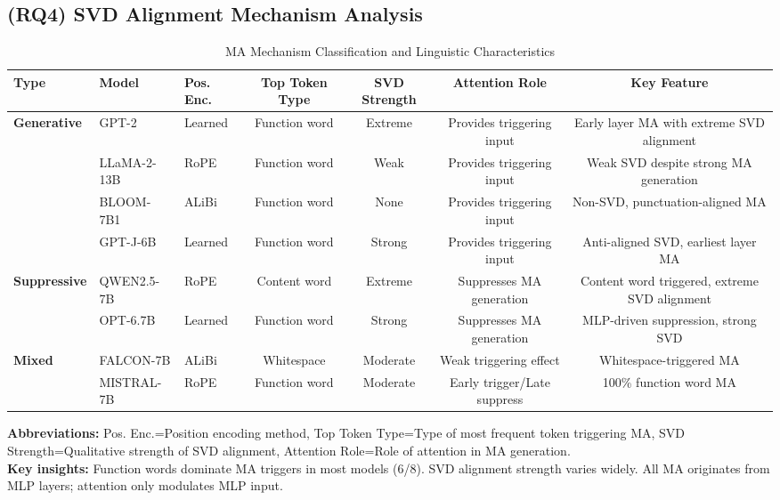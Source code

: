 \documentclass[conference]{IEEEtran}
\begin{document}
\subsection{(RQ4) SVD Alignment Mechanism Analysis}
\label{sec:RQ4}

\begin{table}[htbp]
\centering
\caption{MA Mechanism Classification and Linguistic Characteristics}
\label{tab:ma_mechanism_linguistic}
\footnotesize
\begin{tabular}{@{}lllcccc@{}}
\toprule
\textbf{Type} & \textbf{Model} & \textbf{Pos. Enc.} & \textbf{Top Token Type} & \textbf{SVD Strength} & \textbf{Attention Role} & \textbf{Key Feature} \\
\midrule
\multirow{4}{*}{\textbf{Generative}} 
& GPT-2 & Learned & Function word & Extreme & Provides triggering input & Early layer MA with extreme SVD alignment \\
& LLaMA-2-13B & RoPE & Function word & Weak & Provides triggering input & Weak SVD despite strong MA generation \\
& BLOOM-7B1 & ALiBi & Function word & None & Provides triggering input & Non-SVD, punctuation-aligned MA \\
& GPT-J-6B & Learned & Function word & Strong & Provides triggering input & Anti-aligned SVD, earliest layer MA \\
\midrule
\multirow{2}{*}{\textbf{Suppressive}}
& QWEN2.5-7B & RoPE & Content word & Extreme & Suppresses MA generation & Content word triggered, extreme SVD alignment \\
& OPT-6.7B & Learned & Function word & Strong & Suppresses MA generation & MLP-driven suppression, strong SVD \\
\midrule
\multirow{2}{*}{\textbf{Mixed}}
& FALCON-7B & ALiBi & Whitespace & Moderate & Weak triggering effect & Whitespace-triggered MA \\
& MISTRAL-7B & RoPE & Function word & Moderate & Early trigger/Late suppress & 100\% function word MA \\
\bottomrule
\end{tabular}

\vspace{2mm}
\parbox{\linewidth}{\scriptsize
\textbf{Abbreviations:} Pos. Enc.=Position encoding method, Top Token Type=Type of most frequent token triggering MA, SVD Strength=Qualitative strength of SVD alignment, Attention Role=Role of attention in MA generation. \\
\textbf{Key insights:} Function words dominate MA triggers in most models (6/8). SVD alignment strength varies widely. All MA originates from MLP layers; attention only modulates MLP input.}
\end{table}
\end{document}
